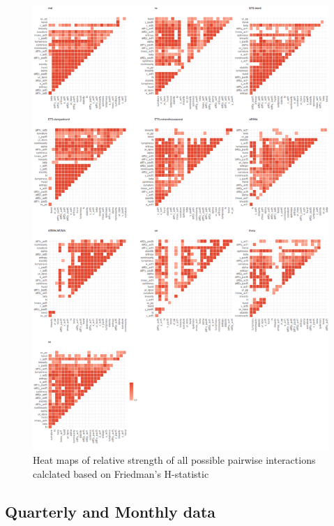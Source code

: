 \documentclass[11pt,a4paper,]{article}
\begin{document}
\begin{figure}
\centering
\includegraphics{figures/friedmany-1.png}
\caption{\label{fig:friedmany}Heat maps of relative strength of all possible
pairwise interactions calclated based on Friedman's H-statistic}
\end{figure}

\newpage

\subsection{Quarterly and Monthly
data}\label{quarterly-and-monthly-data}
\end{document}
